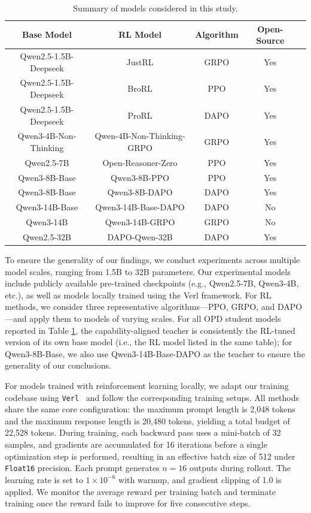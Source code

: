 \documentclass{llmxive}
\begin{document}
\begin{table}[!htbp]
\centering
\setlength{\tabcolsep}{4pt}
\label{mode_config}
\begin{tabular}{ccccc}
\toprule
\textbf{Base Model} & \textbf{RL Model} & \textbf{Algorithm} & \textbf{Open-Source} \\
\midrule
Qwen2.5-1.5B-Deepseek & JustRL \citep{he2025justrlscaling15bllm} & GRPO & Yes \\
Qwen2.5-1.5B-Deepseek & BroRL \citep{Hu2025BroRLSR} & PPO & Yes \\
Qwen2.5-1.5B-Deepseek & ProRL \citep{Liu2025ProRLPR} & DAPO & Yes \\
Qwen3-4B-Non-Thinking & Qwen-4B-Non-Thinking-GRPO & GRPO & Yes \\
Qwen2.5-7B & Open-Reasoner-Zero \citep{hu2025openreasonerzeroopensourceapproach} & PPO & Yes \\
Qwen3-8B-Base & Qwen3-8B-PPO \citep{cai2025predictability} & PPO & Yes \\
Qwen3-8B-Base & Qwen3-8B-DAPO \citep{cai2025predictability} & DAPO & Yes \\
Qwen3-14B-Base & Qwen3-14B-Base-DAPO & DAPO & No \\
Qwen3-14B & Qwen3-14B-GRPO & GRPO & No \\
Qwen2.5-32B & DAPO-Qwen-32B \citep{yu2025dapoopensourcellmreinforcement} & DAPO & Yes \\
\bottomrule
\end{tabular}
\caption{Summary of models considered in this study.}
\end{table}

To ensure the generality of our findings, we conduct experiments across multiple model scales, ranging from 1.5B to 32B parameters. Our experimental models include publicly available pre-trained checkpoints (e.g., Qwen2.5-7B, Qwen3-4B, etc.), as well as models locally trained using the Verl framework. For RL methods, we consider three representative algorithms—PPO, GRPO, and DAPO—and apply them to models of varying scales. For all OPD student models reported in Table \ref{mode_config}, the capability-aligned teacher is consistently the RL-tuned version of its own base model (i.e., the RL model listed in the same table); for Qwen3-8B-Base, we also use Qwen3-14B-Base-DAPO as the teacher to ensure the generality of our conclusions.


For models trained with reinforcement learning locally, we adapt our training codebase using \texttt{Verl}~\citep{Sheng_2025} and follow the corresponding training setups. All methods share the same core configuration: the maximum prompt length is 2{,}048 tokens and the maximum response length is 20{,}480 tokens, yielding a total budget of 22{,}528 tokens. During training, each backward pass uses a mini-batch of 32 samples, and gradients are accumulated for 16 iterations before a single optimization step is performed, resulting in an effective batch size of 512 under \texttt{Float16} precision. Each prompt generates $n = 16$ outputs during rollout. The learning rate is set to $1 \times 10^{-6}$ with warmup, and gradient clipping of 1.0 is applied. We monitor the average reward per training batch and terminate training once the reward fails to improve for five consecutive steps.
\end{document}
